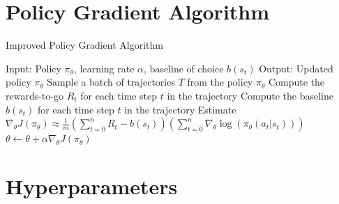 \documentclass{article} %
\theoremstyle{definition}
\begin{document}
\section{Policy Gradient Algorithm}
\label{sec:alg-reinforce}

\begin{algorithm}[H] 
    \caption{Improved Policy Gradient Algorithm}
    \label{alg:reinforce}
    \begin{algorithmic}[1]
        \State Input: Policy $\pi_\theta$, learning rate $\alpha$, baseline of choice $b(s_t)$
        \State Output: Updated policy $\pi_\theta$
            \State Sample a batch of trajectories $T$ from the policy $\pi_\theta$
                \State Compute the rewards-to-go $R_t$ for each time step $t$ in the trajectory
                \State Compute the baseline $b(s_t)$ for each time step $t$ in the trajectory
                \State Estimate $\nabla_\theta J(\pi_\theta) \approx \frac{1}{m} \left(\sum_{t = 0}^{n} R_t - b(s_t)\right) \left( \sum_{t=0}^{n} \nabla_\theta \log(\pi_\theta(a_t | s_t)) \right)$
            \EndFor
            \State $\theta \leftarrow \theta + \alpha \nabla_\theta J(\pi_\theta)$
        \EndWhile
    \end{algorithmic}
\end{algorithm}

\section{Hyperparameters}
\end{document}
